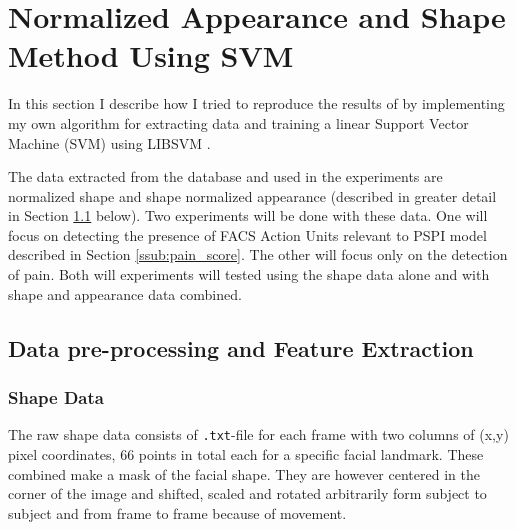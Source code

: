 \documentclass[Main]{subfiles}
\begin{document}
\section{Normalized Appearance and Shape Method Using SVM} %
	\label{sec:normalized_appearance_and_shape_method_using_svm}
	In this section I describe how I tried to reproduce the results of \cite{Lucey2011} by implementing my own algorithm for extracting data and training a linear Support Vector Machine (SVM) using LIBSVM \cite{CC01a}.

	The data extracted from the database and used in the experiments are normalized shape and shape normalized appearance (described in greater detail in Section \ref{sub:data_pre_processing_and_feature_extraction} below).
	Two experiments will be done with these data.
	One will focus on detecting the presence of FACS Action Units relevant to PSPI model described in Section \ref{ssub:pain_score}.
	The other will focus only on the detection of pain.
	Both will experiments will tested using the shape data alone and with shape and appearance data combined.



		

	\subsection{Data pre-processing and Feature Extraction} %
		\label{sub:data_pre_processing_and_feature_extraction}

		\subsubsection{Shape Data} %
			\label{ssub:shape_data}
			The raw shape data consists of \texttt{.txt}-file for each frame with two columns of (x,y) pixel coordinates, 66 points in total each for a specific facial landmark.
			These combined make a mask of the facial shape.
			They are however centered in the corner of the image and shifted, scaled and rotated arbitrarily form subject to subject and from frame to frame because of movement.
\end{document}
